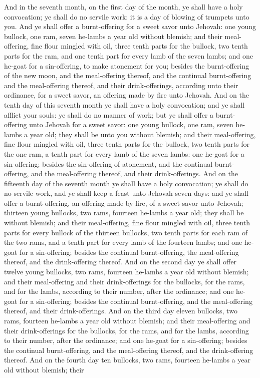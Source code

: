 And in the seventh month, on the first day of the month, ye shall have a holy convocation; ye shall do no servile work: it is a day of blowing of trumpets unto you. And ye shall offer a burnt-offering for a sweet savor unto Jehovah: one young bullock, one ram, seven he-lambs a year old without blemish; and their meal-offering, fine flour mingled with oil, three tenth parts for the bullock, two tenth parts for the ram, and one tenth part for every lamb of the seven lambs; and one he-goat for a sin-offering, to make atonement for you; besides the burnt-offering of the new moon, and the meal-offering thereof, and the continual burnt-offering and the meal-offering thereof, and their drink-offerings, according unto their ordinance, for a sweet savor, an offering made by fire unto Jehovah.  And on the tenth day of this seventh month ye shall have a holy convocation; and ye shall afflict your souls: ye shall do no manner of work; but ye shall offer a burnt-offering unto Jehovah for a sweet savor: one young bullock, one ram, seven he-lambs a year old; they shall be unto you without blemish; and their meal-offering, fine flour mingled with oil, three tenth parts for the bullock, two tenth parts for the one ram, a tenth part for every lamb of the seven lambs: one he-goat for a sin-offering; besides the sin-offering of atonement, and the continual burnt-offering, and the meal-offering thereof, and their drink-offerings.  And on the fifteenth day of the seventh month ye shall have a holy convocation; ye shall do no servile work, and ye shall keep a feast unto Jehovah seven days: and ye shall offer a burnt-offering, an offering made by fire, of a sweet savor unto Jehovah; thirteen young bullocks, two rams, fourteen he-lambs a year old; they shall be without blemish; and their meal-offering, fine flour mingled with oil, three tenth parts for every bullock of the thirteen bullocks, two tenth parts for each ram of the two rams, and a tenth part for every lamb of the fourteen lambs; and one he-goat for a sin-offering; besides the continual burnt-offering, the meal-offering thereof, and the drink-offering thereof.  And on the second day ye shall offer twelve young bullocks, two rams, fourteen he-lambs a year old without blemish; and their meal-offering and their drink-offerings for the bullocks, for the rams, and for the lambs, according to their number, after the ordinance; and one he-goat for a sin-offering; besides the continual burnt-offering, and the meal-offering thereof, and their drink-offerings.  And on the third day eleven bullocks, two rams, fourteen he-lambs a year old without blemish; and their meal-offering and their drink-offerings for the bullocks, for the rams, and for the lambs, according to their number, after the ordinance; and one he-goat for a sin-offering; besides the continual burnt-offering, and the meal-offering thereof, and the drink-offering thereof.  And on the fourth day ten bullocks, two rams, fourteen he-lambs a year old without blemish; their 